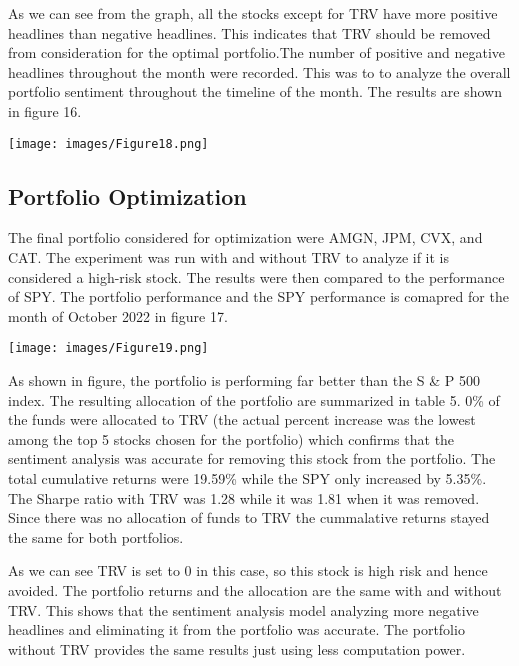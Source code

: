 \documentclass[12pt,a4paper, twoside]{article}
\begin{document}
\begin{multicols}{2}
As we can see from the graph, all the stocks except for TRV have more positive headlines than negative headlines. This indicates that TRV should be removed from consideration for the optimal portfolio.The number of positive and negative headlines throughout the month were recorded. This was to to analyze the overall portfolio sentiment throughout the timeline of the month. The results are shown in figure 16.

    \begin{center}
        \texttt{[image: images/Figure18.png]}
    \end{center}
 

\subsection{Portfolio Optimization}
The final portfolio considered for optimization were AMGN, JPM, CVX, and CAT. The experiment was run with and without TRV to analyze if it is considered a high-risk stock. The results were then compared to the performance of SPY. The portfolio performance and the SPY performance is comapred for the month of October 2022 in figure 17.

    \begin{center}
        \texttt{[image: images/Figure19.png]}
    \end{center}

 
As shown in figure, the portfolio is performing far better than the S \& P 500 index. The resulting allocation of the portfolio are summarized in table 5. 0\% of the funds were allocated to TRV (the actual percent increase was the lowest among the top 5 stocks chosen for the portfolio) which confirms that the sentiment analysis was accurate for removing this stock from the portfolio. The total cumulative returns were 19.59\% while the SPY only increased by 5.35\%. The Sharpe ratio with TRV was 1.28 while it was 1.81 when it was removed. Since there was no allocation of funds to TRV the cummalative returns stayed the same for both portfolios. 
 
As we can see TRV is set to 0 in this case, so this stock is high risk and hence avoided. The portfolio returns and the allocation are the same with and without TRV. This shows that the sentiment analysis model analyzing more negative headlines and eliminating it from the portfolio was accurate. The portfolio without TRV provides the same results just using less computation power.




\end{multicols}
\end{document}
